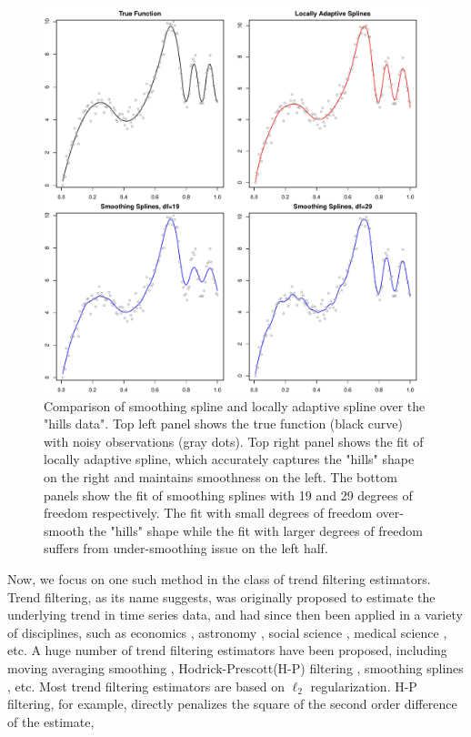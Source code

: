 \documentclass[a4paper]{article}
\begin{document}
\begin{figure}[t!]
\centering
\includegraphics[width = 1\textwidth]{Figures/ssvslars.pdf}
\caption{Comparison of smoothing spline and locally adaptive spline over the "hills data". Top left panel shows the true function (black curve) with noisy observations (gray dots). Top right panel shows the fit of locally adaptive spline, which accurately captures the "hills" shape on the right and maintains smoothness on the left. The bottom panels show the fit of smoothing splines with 19 and 29 degrees of freedom respectively. The fit with small degrees of freedom over-smooth the "hills" shape while the fit with larger degrees of freedom suffers from under-smoothing issue on the left half.}
\label{fig:ssvslars}
\end{figure}

Now, we focus on one such method in the class of trend filtering estimators. Trend filtering, as its name suggests, was originally proposed to estimate the underlying trend in time series data, and had since then been applied in a variety of disciplines, such as economics \cite{hodrick1997postwar,tsay2005analysis}, astronomy \cite{kovacs2008application}, social science \cite{saha2012learning,levitt2004understanding}, medical science \cite{greenland1992methods,link1994estimating}, etc. A huge number of trend filtering estimators have been proposed, including moving averaging smoothing \cite{leser1961simple,kendall1946advanced,lucas1980two}, Hodrick-Prescott(H-P) filtering \cite{hodrick1997postwar},  smoothing splines \cite{carl1978practical,wahba1990spline,green1993nonparametric}, etc. Most trend filtering estimators are based on $\ell_2$ regularization. H-P filtering, for example, directly penalizes the square of the second order difference of the estimate,
\end{document}
